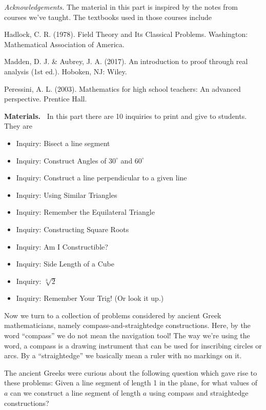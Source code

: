 \documentclass[11pt]{article}
\newenvironment{bignote}[1][Instructor note]%
	{\begin{mdframed}\raggedright{\bf #1.~}}
	{\end{mdframed}}
\theoremstyle{definition}
\begin{document}
{\it Acknowledgements.}  The material in this part is inspired by the notes from courses we've taught. The textbooks used in those courses include

Hadlock, C. R. (1978). Field Theory and Its Classical Problems. Washington: Mathematical Association of America.

Madden, D. J. \& Aubrey, J. A. (2017). An introduction to proof through real analysis (1st ed.). Hoboken, NJ: Wiley.

Peressini, A. L. (2003). Mathematics for high school teachers: An advanced perspective. Prentice Hall.

\newpage
\begin{bignote}[Materials]
  In this part there are 10 inquiries to print and give to students. They are
\begin{itemize}
  \item Inquiry: Bisect a line segment
  \item Inquiry: Construct Angles of $30^\circ$ and $60^\circ$
  \item Inquiry: Construct a line perpendicular to a given line
  \item Inquiry: Using Similar Triangles
  \item Inquiry: Remember the Equilateral Triangle
  \item Inquiry: Constructing Square Roots
  \item Inquiry: Am I Constructible?
  \item Inquiry: Side Length of a Cube
  \item Inquiry: $\sqrt[3]{2}$
  \item Inquiry: Remember Your Trig! (Or look it up.)
\end{itemize}
\end{bignote}

Now we turn to a collection of problems considered by ancient Greek mathematicians, namely compass-and-straightedge constructions. 
Here, by the word ``compass'' we do not mean the navigation tool! The way we're using the word, a compass is a drawing instrument 
that can be used for inscribing circles or arcs. By a ``straightedge'' we basically mean a ruler with no markings on it. 

The ancient Greeks were curious about the following question which gave rise to these problems: Given a line segment of length 1 in the plane, 
for what values of $a$ can we construct a line segment of length $a$ using compass and straightedge constructions?
\end{document}
